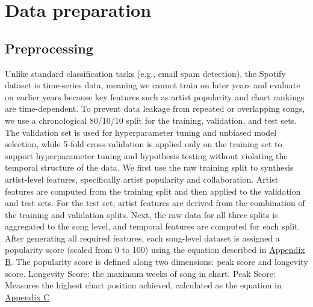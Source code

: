 \documentclass{article}
\begin{document}
\section{Data preparation}
\subsection{Preprocessing}
Unlike standard classification tasks (e.g., email spam detection), the Spotify dataset is time-series data, meaning we cannot train on later years and evaluate on earlier years because key features such as artist popularity and chart rankings are time-dependent. To prevent data leakage from repeated or overlapping songs, we use a chronological 80/10/10 split for the training, validation, and test sets. The validation set is used for hyperparameter tuning and unbiased model selection, while 5-fold cross-validation is applied only on the training set to support hyperparameter tuning and hypothesis testing without violating the temporal structure of the data. We first use the raw training split to synthesis artist-level features, specifically artist popularity and collaboration. Artist features are computed from the training split and then applied to the validation and test sets. For the test set, artist features are derived from the combination of the training and validation splits. Next, the raw data for all three splits is aggregated to the song level, and temporal features are computed for each split. After generating all required features, each song-level dataset is assigned a popularity score (scaled from 0 to 100) using the equation described in \hyperref[eq:popularity_score]{Appendix B}. The popularity score is defined along two dimensions: peak score and longevity score\cite{ref6}. Longevity Score: the maximum weeks of song in chart. Peak Score: Measures the highest chart position achieved, calculated as the equation in \hyperref[eq:peak_score]{Appendix C}
\end{document}
